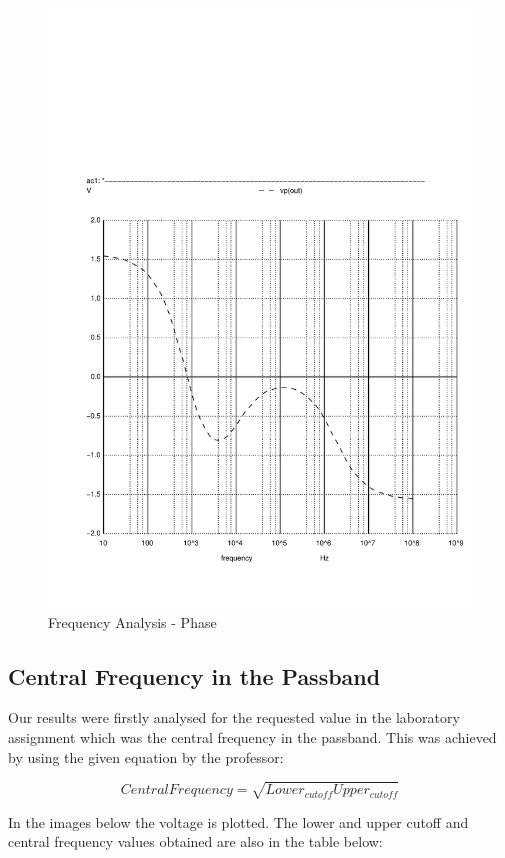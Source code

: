 \begin{figure}[H] \centering
\includegraphics[width=0.7\linewidth]{../sim/vo1p.pdf}
\caption{Frequency Analysis - Phase}
\label{fig:frequency2}
\end{figure}

\subsection{Central Frequency in the Passband}
Our results were firstly analysed for the requested value in the laboratory assignment which was the central frequency in the passband. This was achieved by using the given equation by the professor: \par
\begin{equation}
    CentralFrequency = \sqrt{Lower_{cutoff} Upper_{cutoff}}
\end{equation}\par
In the images below the voltage is plotted. The lower and upper cutoff and central frequency values obtained are also in the table below:

